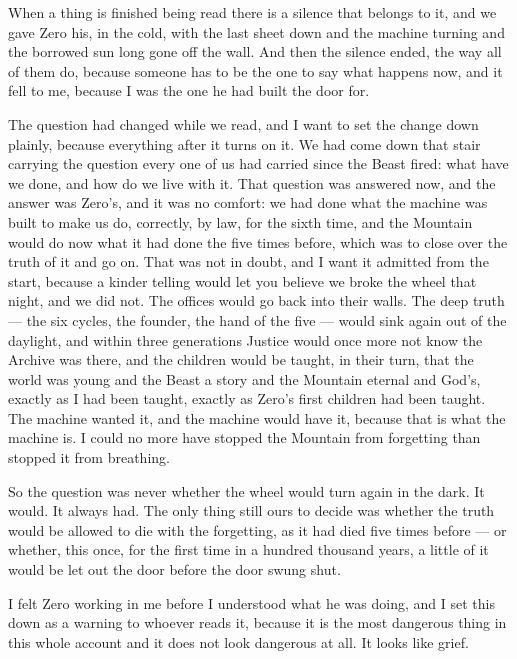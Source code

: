 
When a thing is finished being read there is a silence that belongs to it, and we gave Zero his, in the cold, with the last sheet down and the machine turning and the borrowed sun long gone off the wall. And then the silence ended, the way all of them do, because someone has to be the one to say what happens now, and it fell to me, because I was the one he had built the door for.\par

The question had changed while we read, and I want to set the change down plainly, because everything after it turns on it. We had come down that stair carrying the question every one of us had carried since the Beast fired: what have we done, and how do we live with it. That question was answered now, and the answer was Zero's, and it was no comfort: we had done what the machine was built to make us do, correctly, by law, for the sixth time, and the Mountain would do now what it had done the five times before, which was to close over the truth of it and go on. That was not in doubt, and I want it admitted from the start, because a kinder telling would let you believe we broke the wheel that night, and we did not. The offices would go back into their walls. The deep truth --- the six cycles, the founder, the hand of the five --- would sink again out of the daylight, and within three generations Justice would once more not know the Archive was there, and the children would be taught, in their turn, that the world was young and the Beast a story and the Mountain eternal and God's, exactly as I had been taught, exactly as Zero's first children had been taught. The machine wanted it, and the machine would have it, because that is what the machine is. I could no more have stopped the Mountain from forgetting than stopped it from breathing.\par

So the question was never whether the wheel would turn again in the dark. It would. It always had. The only thing still ours to decide was whether the truth would be allowed to die with the forgetting, as it had died five times before --- or whether, this once, for the first time in a hundred thousand years, a little of it would be let out the door before the door swung shut.\par

\ornament

I felt Zero working in me before I understood what he was doing, and I set this down as a warning to whoever reads it, because it is the most dangerous thing in this whole account and it does not look dangerous at all. It looks like grief.\par

